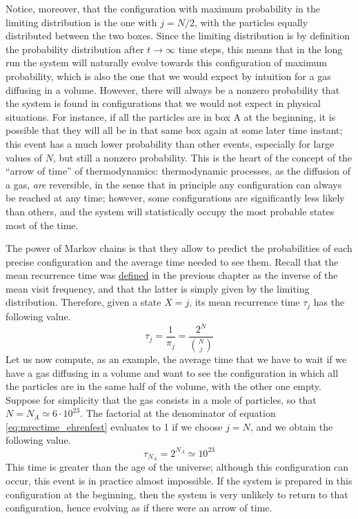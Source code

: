 Notice, moreover, that the configuration with maximum probability in the limiting distribution is the one with $j = N/2$, \ie with the particles equally distributed between the two boxes. Since the limiting distribution is by definition the probability distribution after $t\rightarrow \infty$ time steps, this means that in the long run the system will naturally evolve towards this configuration of maximum probability, which is also the one that we would expect by intuition for a gas diffusing in a volume. However, there will always be a nonzero probability that the system is found in configurations that we would not expect in physical situations. For instance, if all the particles are in box A at the beginning, it is possible that they will all be in that same box again at some later time instant; this event has a much lower probability than other events, especially for large values of $N$, but still a nonzero probability. This is the heart of the concept of the \enquote{arrow of time} of thermodynamics: thermodynamic processes, as the diffusion of a gas, \emph{are} reversible, in the sense that in principle any configuration can always be reached at any time; however, some configurations are significantly less likely than others, and the system will statistically occupy the most probable states most of the time. 

The power of Markov chains is that they allow to predict the probabilities of each precise configuration and the average time needed to see them. Recall that the mean recurrence time was \hyperref[def:mean_rec_time] {defined} in the previous chapter as the inverse of the mean visit frequency, and that the latter is simply given by the limiting distribution. Therefore, given a state $X = j$, its mean recurrence time $\tau_j$ has the following value.
\begin{equation} \label{eq:mrectime_ehrenfest}
    \tau_j = \frac{1}{\pi_j} = \frac{2^N}{{{N} \choose {j}}} 
\end{equation}
Let us now compute, as an example, the average time that we have to wait if we have a gas diffusing in a volume and want to see the configuration in which all the particles are in the same half of the volume, with the other one empty. Suppose for simplicity that the gas consists in a mole of particles, so that $N = N_A \simeq 6\cdot 10^{23}$. The factorial at the denominator of equation \ref{eq:mrectime_ehrenfest} evaluates to 1 if we choose $j = N$, and we obtain the following value.
\begin{equation}
    \tau_{N_A} = 2^{N_A} \simeq 10^{23}
\end{equation}
This time is greater than the age of the universe; although this configuration can occur, this event is in practice almost impossible. If the system is prepared in this configuration at the beginning, then the system is very unlikely to return to that configuration, hence evolving as if there were an arrow of time.